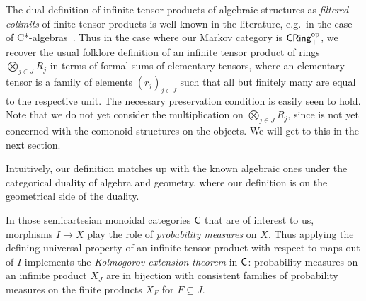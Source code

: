 \documentclass[11pt]{article}
\begin{document}
\begin{example}
	\label{infprods_cring}
	The dual definition of infinite tensor products of algebraic structures as \emph{filtered colimits} of finite tensor products is well-known in the literature, e.g.~in the case of C*-algebras~\cite[p.~315]{blackadar}. Thus in the case where our Markov category is $\operatorname{\mathsf{CRing}}_+^{\mathrm{op}}$, we recover the usual folklore definition of an infinite tensor product of rings $\bigotimes_{j \in J} R_j$ in terms of formal sums of elementary tensors, where an elementary tensor is a family of elements $(r_j)_{j \in J}$ such that all but finitely many are equal to the respective unit. The necessary preservation condition is easily seen to hold. Note that we do not yet consider the multiplication on $\bigotimes_{j \in J} R_j$, since  is not yet concerned with the comonoid structures on the objects. We will get to this in the next section.
	
	Intuitively, our definition matches up with the known algebraic ones under the categorical duality of algebra and geometry, where our definition is on the geometrical side of the duality.
\end{example}

\begin{remark}
	In those semicartesian monoidal categories $\mathsf{C}$ that are of interest to us, morphisms $I \to X$ play the role of \emph{probability measures} on $X$. Thus applying the defining universal property of an infinite tensor product with respect to maps out of $I$ implements the \emph{Kolmogorov extension theorem} in $\mathsf{C}$: probability measures on an infinite product $X_J$ are in bijection with consistent families of probability measures on the finite products $X_F$ for $F \subseteq J$.
\end{remark}
\end{document}
